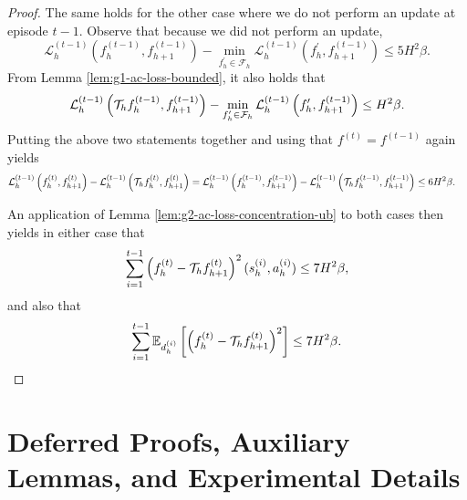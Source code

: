 \begin{proof}
    The same holds for the other case where we do not perform an update at episode $t-1$. Observe that because we did not perform an update,  
    $$\mathcal{L}_h^{(t-1)}\left(f_h^{(t-1)}, f_{h+1}^{(t-1)}\right)-\min_{f_h^{\prime} \in \mathcal{F}_h} \mathcal{L}_h^{(t-1)}\left(f_h^{\prime}, f_{h+1}^{(t-1)}\right) \leq 5 H^2\beta.$$
    From Lemma \ref{lem:g1-ac-loss-bounded}, it also holds that
    $$\mathcal{L}_h^{(t-1)}\left({\mathcal{T}}_h f_h^{(t-1)}, f_{h+1}^{(t-1)}\right)-\min_{f_h^{\prime} \in \mathcal{F}_h} \mathcal{L}_h^{(t-1)}\left(f_h^{\prime}, f_{h+1}^{(t-1)}\right) \leq H^2\beta.$$
    Putting the above two statements together and using that $f^{(t)} = f^{(t-1)}$ again yields 
    \begin{align}
        &\mathcal{L}_h^{(t-1)}\left(f_h^{(t)}, f_{h+1}^{(t)}\right) - \mathcal{L}_h^{(t-1)}\left({\mathcal{T}}_h f_h^{(t)}, f_{h+1}^{(t)}\right) = \mathcal{L}_h^{(t-1)}\left(f_h^{(t-1)}, f_{h+1}^{(t-1)}\right) - \mathcal{L}_h^{(t-1)}\left({\mathcal{T}}_h f_h^{(t-1)}, f_{h+1}^{(t-1)}\right) \leq 6H^2\beta.
    \end{align}

    An application of Lemma \ref{lem:g2-ac-loss-concentration-ub} to both cases then yields in either case that 
\begin{align}\sum_{i=1}^{t-1}\left(f_h^{(t)} - {\mathcal{T}}_h f_{h+1}^{(t)}\right)^2(s_h^{(i)}, a_h^{(i)}) \leq 7H^2\beta,\end{align}
    and also that 
    \begin{align}\sum_{i=1}^{t-1}\mathbb{E}_{d_h^{(i)}}\left[\left(f_h^{(t)} - {\mathcal{T}}_h f_{h+1}^{(t)}\right)^2\right] \leq 7H^2\beta.\end{align}
\end{proof}

\section{Deferred Proofs, Auxiliary Lemmas, and Experimental Details}
\label{app:noah-pi-proofs}\label{eqn:reg-decom-alg3}\label{eqn:reg-decom-alg3-1}\label{app:noah-star-proofs}\label{app:hybrid-rl-nora}\label{lem:optimism-Q-pi-t}\label{lem:optimism-Q-pi-star}\label{lem:ac-loss-bounded-optimism-hybrid}\label{lem:g1-ac-loss-bounded}\label{lem:g2-ac-loss-concentration-ub}\label{lem:g3-ac-loss-concentration-ub}\label{app:problem-target-q-pi}\label{alg:NORA-pi-long}\label{lem:b1-covering-number-value}\label{lem:b3-zhong-policy-q-ineq}\label{lem:policy-value-difference-lemma}\label{lem: KL}\label{lem:policy-difference}\label{app:experiment_details}

